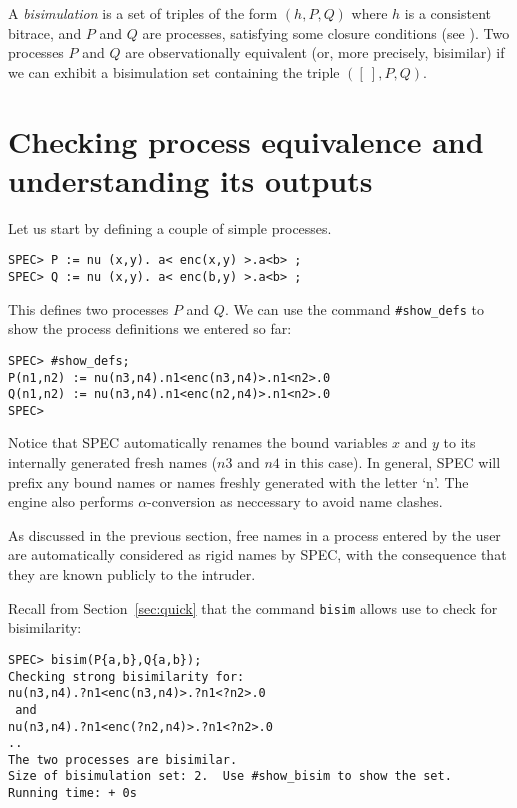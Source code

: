 \documentclass{article}
\begin{document}
A {\em bisimulation} is a set of triples of the form $(h, P, Q)$ where $h$ is a consistent bitrace,
and $P$ and $Q$ are processes, satisfying some closure conditions (see \cite{tiu09corr}). 
Two processes $P$ and $Q$ are observationally equivalent (or, more precisely, bisimilar)
if we can exhibit a bisimulation set containing the triple $([~], P, Q)$.

\section{Checking process equivalence and understanding its outputs}
\label{sec:equiv}

Let us start by defining a couple of simple processes. 
\begin{verbatim}
SPEC> P := nu (x,y). a< enc(x,y) >.a<b> ;
SPEC> Q := nu (x,y). a< enc(b,y) >.a<b> ;
\end{verbatim}
This defines two processes $P$ and $Q$. We can use the command
\texttt{\#show\_defs} to show the process definitions we entered so far:
\begin{verbatim}
SPEC> #show_defs;
P(n1,n2) := nu(n3,n4).n1<enc(n3,n4)>.n1<n2>.0
Q(n1,n2) := nu(n3,n4).n1<enc(n2,n4)>.n1<n2>.0
SPEC> 
\end{verbatim}
Notice that SPEC automatically renames the bound variables $x$ and $y$
to its internally generated fresh names ($n3$ and $n4$ in this case).
In general, SPEC will prefix any bound names or names freshly 
generated with the letter `n'. The engine also performs $\alpha$-conversion
as neccessary to avoid name clashes. 

As discussed in the previous section, free names in a process entered by the user
 are automatically
considered as rigid names by SPEC, with the consequence that they are known publicly
to the intruder. 

Recall from Section~\ref{sec:quick} that the command \texttt{bisim} allows use to check
for bisimilarity: 
\begin{verbatim}
SPEC> bisim(P{a,b},Q{a,b});
Checking strong bisimilarity for: 
nu(n3,n4).?n1<enc(n3,n4)>.?n1<?n2>.0
 and 
nu(n3,n4).?n1<enc(?n2,n4)>.?n1<?n2>.0
..
The two processes are bisimilar.
Size of bisimulation set: 2.  Use #show_bisim to show the set.
Running time: + 0s
\end{verbatim}
\end{document}
